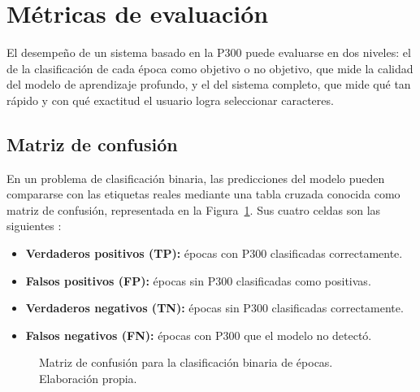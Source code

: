 \section[MÉTRICAS DE EVALUACIÓN]{Métricas de evaluación}
\label{sec:metricas}

El desempeño de un sistema basado en la P300 puede evaluarse en dos niveles: el de la
clasificación de cada época como objetivo o no objetivo, que mide la calidad del modelo de
aprendizaje profundo, y el del sistema completo, que mide qué tan rápido y con qué exactitud el
usuario logra seleccionar caracteres.

\subsection{Matriz de confusión}

En un problema de clasificación binaria, las predicciones del modelo pueden compararse con las
etiquetas reales mediante una tabla cruzada conocida como matriz de confusión, representada en la
Figura~\ref{fig:confusion}. Sus cuatro celdas son las siguientes
\cite{fawcett2006}:
\begin{itemize}
  \item \textbf{Verdaderos positivos (TP):} épocas con P300 clasificadas correctamente.
  \item \textbf{Falsos positivos (FP):} épocas sin P300 clasificadas como positivas.
  \item \textbf{Verdaderos negativos (TN):} épocas sin P300 clasificadas correctamente.
  \item \textbf{Falsos negativos (FN):} épocas con P300 que el modelo no detectó.
\end{itemize}

\begin{figure}[htbp]
\centering
{}
\caption{Matriz de confusión para la clasificación binaria de épocas. Elaboración propia.}
\label{fig:confusion}
\end{figure}

